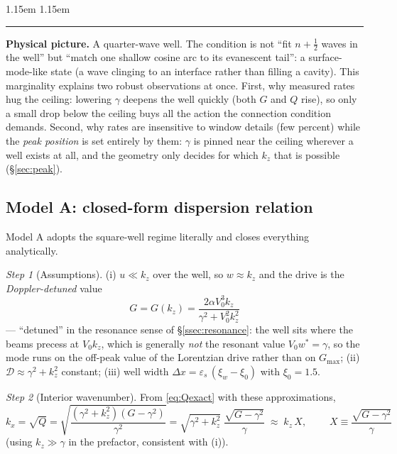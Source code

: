 \documentclass[11pt,a4paper]{article}
\numberwithin{equation}{section}
\theoremstyle{remark}
\newtheorem{step}{Step}[subsection]
\newenvironment{intuition}%
{\par\medskip\noindent
 \begin{list}{}{\leftmargin 1.15em \rightmargin 1.15em \listparindent 0pt
 \itemindent 0pt \parsep 2pt \topsep 2pt}\item\relax
 \small\textcolor{intu}{\rule[-0.6ex]{2.6pt}{2.4ex}}\hspace{0.55em}%
 \textcolor{intu}{\textbf{Physical picture.}}\hspace{0.5em}\ignorespaces}%
{\end{list}\medskip}
\newcommand{\eps}{\varepsilon_s}                 %
\newcommand{\Vo}{V_0}
\newcommand{\kz}{k_z}
\newcommand{\D}{\mathcal{D}}
\begin{document}
\begin{intuition}
A quarter-wave well. The condition is not ``fit $n+\tfrac12$ waves in
the well'' but ``match one shallow cosine arc to its evanescent tail'':
a surface-mode-like state (a wave clinging to an interface rather than
filling a cavity). This marginality explains two robust
observations at once. First, why measured rates hug the ceiling:
lowering $\gamma$ deepens the well quickly (both $G$ and $Q$ rise), so
only a small drop below the ceiling buys all the action the connection
condition demands. Second, why rates are insensitive to window details
(few percent) while the \emph{peak position} is set entirely by them:
$\gamma$ is pinned near the ceiling wherever a well exists at all, and
the geometry only decides for which $\kz$ that is possible
(\S\ref{sec:peak}).
\end{intuition}

\subsection{Model A: closed-form dispersion relation}
\label{ssec:modelA}

Model A adopts the square-well regime literally and closes everything
analytically.

\begin{step}[Assumptions]
(i) $u\ll\kz$ over the well, so $w\approx\kz$ and the drive is the
\emph{Doppler-detuned} value
\begin{equation}
G=G(\kz)=\frac{2\alpha\Vo^3\kz}{\gamma^2+\Vo^2\kz^2}
\label{eq:GofK}
\end{equation}
--- ``detuned'' in the resonance sense of \S\ref{ssec:resonance}: the
well sits where the beams precess at $\Vo\kz$, which is generally
\emph{not} the resonant value $\Vo w^*=\gamma$, so the mode runs on the
off-peak value of the Lorentzian drive rather than on $G_{\max}$;
(ii) $\D\approx\gamma^2+\kz^2$ constant;
(iii) well width $\Delta x=\eps\,(\xi_w-\xi_0)$ with $\xi_0=1.5$.
\end{step}

\begin{step}[Interior wavenumber]
From \eqref{eq:Qexact} with these approximations,
\begin{equation}
k_x=\sqrt{Q}
=\sqrt{\frac{(\gamma^2+\kz^2)(G-\gamma^2)}{\gamma^2}}
=\sqrt{\gamma^2+\kz^2}\;\frac{\sqrt{G-\gamma^2}}{\gamma}
\;\approx\;\kz\,X,
\qquad
\boxed{\;X\equiv\frac{\sqrt{G-\gamma^2}}{\gamma}\;}
\label{eq:Xdef}
\end{equation}
(using $\kz\gg\gamma$ in the prefactor, consistent with (i)).
\end{step}
\end{document}
